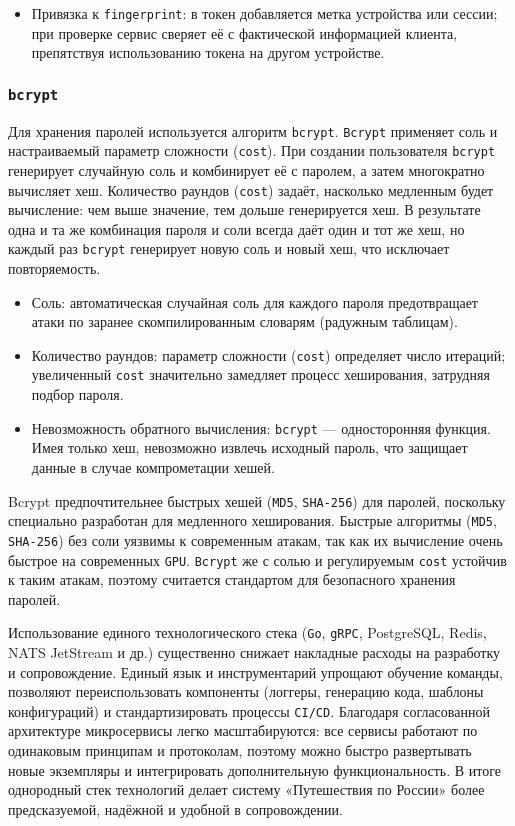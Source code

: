 \begin{itemize}
    \item Привязка к \texttt{fingerprint}: в токен добавляется метка устройства или сессии; при проверке сервис сверяет её с фактической информацией клиента, препятствуя использованию токена на другом устройстве.
\end{itemize}

\subsubsection*{\texttt{bcrypt}}
Для хранения паролей используется алгоритм \texttt{bcrypt}. \texttt{Bcrypt} применяет соль и настраиваемый параметр сложности (\texttt{cost}). При создании пользователя \texttt{bcrypt} генерирует случайную соль и комбинирует её с паролем, а затем многократно вычисляет хеш. Количество раундов (\texttt{cost}) задаёт, насколько медленным будет вычисление: чем выше значение, тем дольше генерируется хеш. В результате одна и та же комбинация пароля и соли всегда даёт один и тот же хеш, но каждый раз \texttt{bcrypt} генерирует новую соль и новый хеш, что исключает повторяемость.
\begin{itemize}
    \item Соль: автоматическая случайная соль для каждого пароля предотвращает атаки по заранее скомпилированным словарям (радужным таблицам).
    \item Количество раундов: параметр сложности (\texttt{cost}) определяет число итераций; увеличенный \texttt{cost} значительно замедляет процесс хеширования, затрудняя подбор пароля.
    \item Невозможность обратного вычисления: \texttt{bcrypt} — односторонняя функция. Имея только хеш, невозможно извлечь исходный пароль, что защищает данные в случае компрометации хешей.
\end{itemize}
\noindent Bcrypt предпочтительнее быстрых хешей (\texttt{MD5}, \texttt{SHA-256}) для паролей, поскольку специально разработан для медленного хеширования. Быстрые алгоритмы (\texttt{MD5}, \texttt{SHA-256}) без соли уязвимы к современным атакам, так как их вычисление очень быстрое на современных \texttt{GPU}. \texttt{Bcrypt} же с солью и регулируемым \texttt{cost} устойчив к таким атакам, поэтому считается стандартом для безопасного хранения паролей. 

Использование единого технологического стека (\texttt{Go}, \texttt{gRPC}, PostgreSQL, Redis, NATS JetStream и др.) существенно снижает накладные расходы на разработку и сопровождение. Единый язык и инструментарий упрощают обучение команды, позволяют переиспользовать компоненты (логгеры, генерацию кода, шаблоны конфигураций) и стандартизировать процессы \texttt{CI/CD}. Благодаря согласованной архитектуре микросервисы легко масштабируются: все сервисы работают по одинаковым принципам и протоколам, поэтому можно быстро развертывать новые экземпляры и интегрировать дополнительную функциональность. В итоге однородный стек технологий делает систему «Путешествия по России» более предсказуемой, надёжной и удобной в сопровождении.


